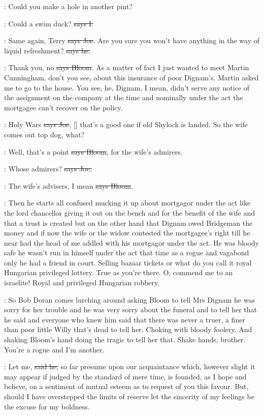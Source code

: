 \joe:
Could you make a hole in another pint?

:
Could a swim duck? \sout{says I.}

\joe:
Same again, Terry \sout{says Joe}.
Are you sure you won't have anything in the
way of liquid refreshment? \sout{says he.}

\Bloom:
Thank you, no \sout{says Bloom}.
As a matter of fact I just wanted to meet
Martin Cunningham, don't you see, about this insurance of poor Dignam's.
Martin asked me to go to the house. You see, he, Dignam, I mean, didn't
serve any notice of the assignment on the company at the time and
nominally under the act the mortgagee can't recover on the policy.

\joe:
Holy Wars \sout{says Joe},
[] that's a good one if old Shylock is
landed. So the wife comes out top dog, what?

\Bloom:
Well, that's a point \sout{says Bloom},
for the wife's admirers.

\joe:
Whose admirers? \sout{says Joe.}

\Bloom:
The wife's advisers, I mean \sout{says Bloom}.

\Nq:
Then he starts all confused mucking it up about mortgagor under the act
like the lord chancellor giving it out on the bench and for the benefit of
the wife and that a trust is created but on the other hand that Dignam
owed Bridgeman the money and if now the wife or the widow contested the
mortgagee's right till he near had the head of me addled with his
mortgagor under the act. He was bloody safe he wasn't run in himself under
the act that time as a rogue and vagabond only he had a friend in court.
Selling bazaar tickets or what do you call it royal Hungarian privileged
lottery. True as you're there. O, commend me to an israelite! Royal and
privileged Hungarian robbery.

\Nq:
So Bob Doran comes lurching around asking Bloom to tell Mrs
Dignam he was sorry for her trouble and he was very sorry about the
funeral and to tell her that he said and everyone who knew him said that
there was never a truer, a finer than poor little Willy that's dead to tell
her. Choking with bloody foolery. And shaking Bloom's hand doing the
tragic to tell her that. Shake hands, brother. You're a rogue and I'm
another.

\doran:
Let me, \sout{said he,}
so far presume upon our acquaintance which, however
slight it may appear if judged by the standard of mere time, is founded,
as I hope and believe, on a sentiment of mutual esteem as to request of
you this favour. But, should I have overstepped the limits of reserve
let the sincerity of my feelings be the excuse for my boldness.


